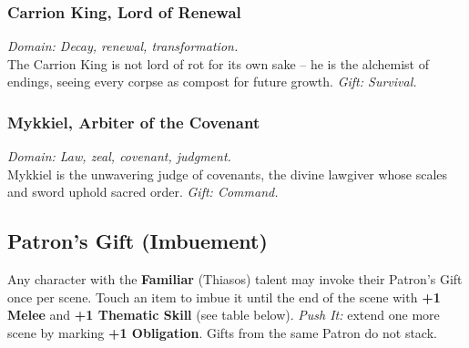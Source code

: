\subsubsection{Carrion King, Lord of Renewal}
\emph{Domain: Decay, renewal, transformation.} \\
The Carrion King is not lord of rot for its own sake -- he is the alchemist of endings, seeing every corpse as compost for future growth. \textit{Gift: Survival.}

\subsubsection{Mykkiel, Arbiter of the Covenant}
\emph{Domain: Law, zeal, covenant, judgment.} \\
Mykkiel is the unwavering judge of covenants, the divine lawgiver whose scales and sword uphold sacred order. \textit{Gift: Command.}

\subsection{Patron's Gift (Imbuement)}
\label{subsec:patron-gift-srd}
Any character with the \textbf{Familiar} (Thiasos) talent may invoke their Patron's Gift once per scene. Touch an item to imbue it until the end of the scene with \textbf{+1 Melee} and \textbf{+1 Thematic Skill} (see table below). \emph{Push It:} extend one more scene by marking \textbf{+1 Obligation}. Gifts from the same Patron do not stack.


